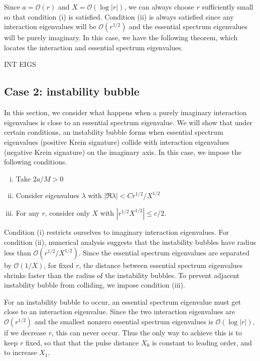 \documentclass[thesis.tex]{subfiles}
\begin{document}
Since $a = \mathcal{O}(r)$ and $X = \mathcal{O}(\log|r|)$, we can always choose $r$ sufficiently small so that condition (i) is satisfied. Condition (ii) is always satisfied since any interaction eigenvalues will be $\mathcal{O}(r^{1/2})$ and the essential spectrum eigenvalues will be purely imaginary. In this case, we have the following theorem, which locates the interaction and essential spectrum eigenvalues.

\begin{theorem}INT EIGS
\end{theorem}

\subsection{Case 2: instability bubble}

In this section, we consider what happens when a purely imaginary interaction eigenvalues is close to an essential spectrum eigenvalue. We will show that under certain conditions, an instability bubble forms when essential spectrum eigenvalues (positive Krein signature) collide with interaction eigenvalues (negative Krein signature) on the imaginary axis. In this case, we impose the following conditions.

\begin{enumerate}[(i)]
	\item Take $2a/M > 0$
	\item Consider eigenvalues $\lambda$ with $|\Re \lambda| < C r^{1/2}/X^{1/2}$
	\item For any $r$, consider only $X$ with
	$\left| r^{1/2} X^{1/2} \right| \leq c/2$. 
	\end{enumerate}

Condition (i) restricts ourselves to imaginary interaction eigenvalues. For condition (ii), numerical analysis suggests that the instability bubbles have radius less than $\mathcal{O}(r^{1/2}/X^{1/2})$. Since the essential spectrum eigenvalues are separated by $\mathcal{O}(1/X)$, for fixed $r$, the distance between essential spectrum eigenvalues shrinks faster than the radius of the instability bubbles. To prevent adjacent instability bubble from colliding, we impose condition (iii).

For an instability bubble to occur, an essential spectrum eigenvalue must get close to an interaction eigenvalue. Since the two interaction eigenvalues are $\mathcal{O}(r^{1/2})$ and the smallest nonzero essential spectrum eigenvalues is $\mathcal{O}(\log|r|)$, if we decrease $r$, this can never occur. Thus the only way to achieve this is to keep $r$ fixed, so that that the pulse distance $X_0$ is constant to leading order, and to increase $X_1$.
\end{document}

